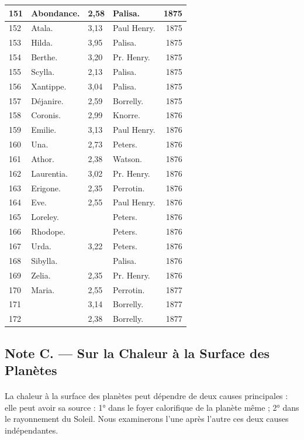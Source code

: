\documentclass[a4paper, 11pt, oneside, landscape]{article}
\begin{document}
\begin{landscape}
\begin{center}
\begin{longtable}{|p{10mm}|l|p{10mm}|l|r|}
        151 & Abondance. & 2,58 & Palisa. & 1875 \\ \hline
        152 & Atala. & 3,13 & Paul Henry. & 1875 \\ \hline
        153 & Hilda. & 3,95 & Palisa. & 1875 \\ \hline
        154 & Berthe. & 3,20 & Pr. Henry. & 1875 \\ \hline
        155 & Scylla. & 2,13 & Palisa. & 1875 \\ \hline
        156 & Xantippe. & 3,04 & Palisa. & 1875 \\ \hline
        157 & Déjanire. & 2,59 & Borrelly. & 1875 \\ \hline
        158 & Coronis. & 2,99 & Knorre. & 1876 \\ \hline
        159 & Emilie. & 3,13 & Paul Henry. & 1876 \\ \hline
        160 & Una. & 2,73 & Peters. & 1876 \\ \hline
        161 & Athor. & 2,38 & Watson. & 1876 \\ \hline
        162 & Laurentia. & 3,02 & Pr. Henry. & 1876 \\ \hline
        163 & Erigone. & 2,35 & Perrotin. & 1876 \\ \hline
        164 & Eve. & 2,55 & Paul Henry. & 1876 \\ \hline
        165 & Loreley. & ~ & Peters. & 1876 \\ \hline
        166 & Rhodope. & ~ & Peters. & 1876 \\ \hline
        167 & Urda. & 3,22 & Peters. & 1876 \\ \hline
        168 & Sibylla. & ~ & Palisa. & 1876 \\ \hline
        169 & Zelia. & 2,35 & Pr. Henry. & 1876 \\ \hline
        170 & Maria. & 2,55 & Perrotin. & 1877 \\ \hline
        171 & ~ & 3,14 & Borrelly. & 1877 \\ \hline
        172 & ~ & 2,38 & Borrelly. & 1877 \\ \hline
    \end{longtable}
\end{center}
\end{landscape}
\clearpage
\subsection{Note C. --- Sur la Chaleur à la Surface des Planètes}
\paragraph{}
La chaleur à la surface des planètes peut dépendre de deux causes principales : elle peut avoir sa source : 1° dans le foyer calorifique de la planète même ; 2° dans le rayonnement du Soleil. Nous examinerons l'une après l'autre ces deux causes indépendantes.
\end{document}
